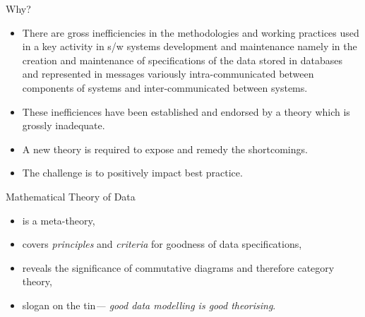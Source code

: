 \begin{frame}{Why?}
\begin{itemize}[<+->]
  \item There are gross inefficiencies in the methodologies and working practices used in  a key activity in s/w systems development and maintenance namely in  the creation and maintenance of specifications of the data stored in databases and 
  represented in messages variously intra-communicated between components of systems and inter-communicated between systems. 
  \item These inefficiences have been established and endorsed by a theory which is grossly inadequate.
  \item A new theory is required to expose and remedy the shortcomings.
  \item The challenge is to positively impact best practice.
\end{itemize}
\end{frame}

\begin{frame}{Mathematical Theory of Data}
\begin{itemize}
\item is a meta-theory,
\item covers \textit{principles} and \textit{criteria} for goodness of data specifications,
\item reveals the significance of commutative diagrams and therefore category theory,
\item slogan on the tin\textit{--- good data modelling is good theorising}. 
\end{itemize}
\end{frame}








